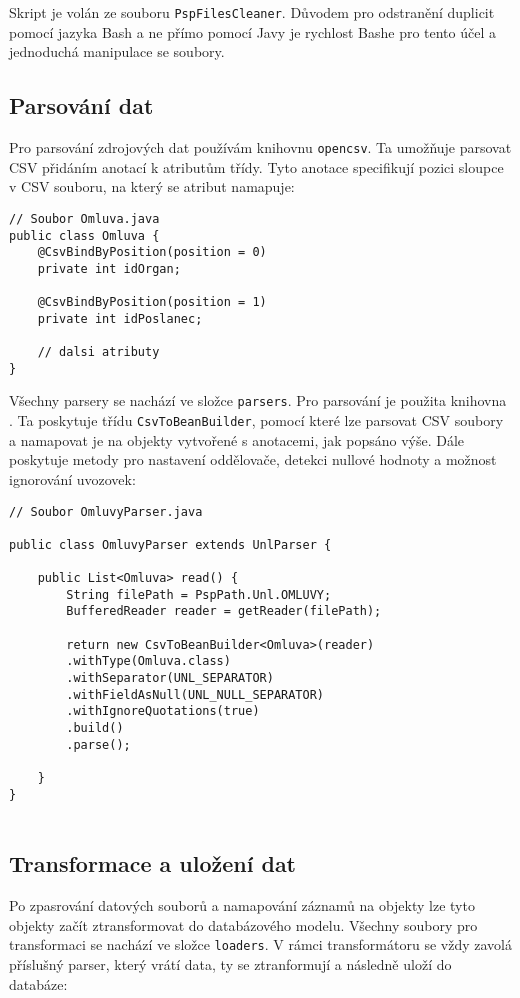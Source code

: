 \noindent Skript je volán ze souboru \lstinline|PspFilesCleaner|. Důvodem pro odstranění duplicit pomocí jazyka Bash a ne přímo pomocí Javy je rychlost Bashe pro tento účel a jednoduchá manipulace se soubory.

\subsection{Parsování dat}
Pro parsování zdrojových dat používám knihovnu \lstinline|opencsv|. Ta umožňuje parsovat CSV přidáním anotací k atributům třídy. Tyto anotace specifikují pozici sloupce v CSV souboru, na který se atribut namapuje:

\begin{lstlisting}[caption={Parsování datového souboru omluvy.unl}, tabsize=2]
// Soubor Omluva.java
public class Omluva {
	@CsvBindByPosition(position = 0)
	private int idOrgan;
	
	@CsvBindByPosition(position = 1)
	private int idPoslanec;

	// dalsi atributy	
}
\end{lstlisting}

\noindent Všechny parsery se nachází ve složce \lstinline|parsers|. Pro parsování je použita knihovna \cite{opencsv}. Ta poskytuje třídu \lstinline|CsvToBeanBuilder|, pomocí které lze parsovat CSV soubory a namapovat je na objekty vytvořené s anotacemi, jak popsáno výše. Dále poskytuje metody pro nastavení oddělovače, detekci nullové hodnoty a možnost ignorování uvozovek:

\begin{lstlisting}[caption={Parsování datového souboru omluvy.unl}, tabsize=2]
// Soubor OmluvyParser.java
	
public class OmluvyParser extends UnlParser {
	
	public List<Omluva> read() {
		String filePath = PspPath.Unl.OMLUVY;
		BufferedReader reader = getReader(filePath);
		
		return new CsvToBeanBuilder<Omluva>(reader)
		.withType(Omluva.class)
		.withSeparator(UNL_SEPARATOR)
		.withFieldAsNull(UNL_NULL_SEPARATOR)
		.withIgnoreQuotations(true)
		.build()
		.parse();
		
	}
}
	
\end{lstlisting}

\subsection{Transformace a uložení dat}
Po zpasrování datových souborů a namapování záznamů na objekty lze tyto objekty začít ztransformovat do databázového modelu. Všechny soubory pro transformaci se nachází ve složce \lstinline|loaders|. V rámci transformátoru se vždy zavolá příslušný parser, který vrátí data, ty se ztranformují \linebreak a následně uloží do databáze:

